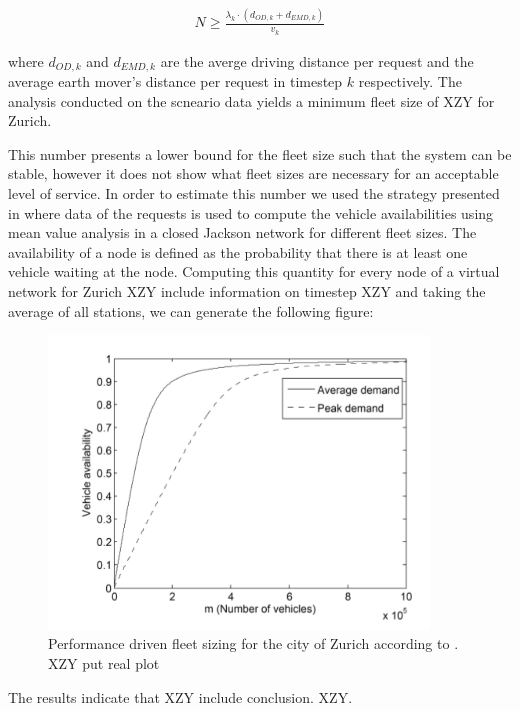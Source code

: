 \begin{align}
N \geq \frac{\lambda_k \cdot (d_{OD,k} + d_{EMD,k} )}{v_k}
\end{align}

where $d_{OD,k}$ and $d_{EMD,k}$ are the averge driving distance per request and the average earth mover's distance per request in timestep $k$ respectively. The analysis conducted on the scneario data yields a minimum fleet size of XZY for Zurich.

This number presents a lower bound for the fleet size such that the system can be stable, however it does not show what fleet sizes are necessary for an acceptable level of service. In order to estimate this number we used the strategy presented in \cite{spieser2014toward} where data of the requests is used to compute the vehicle availabilities using mean value analysis in a closed Jackson network for different fleet sizes. The availability of a node is defined as the probability that there is at least one vehicle waiting at the node. Computing this quantity for every node of a virtual network for Zurich  XZY include information on timestep XZY and taking the average of all stations, we can generate the following figure:




\begin{figure}[h]
\begin{center}\includegraphics[width=0.9\textwidth]{figures/performancePlot.png}\end{center}
\caption{Performance driven fleet sizing for the city of Zurich according to \cite{spieser2014toward}. XZY put real plot}
\label{fig:performanceFleetSize}
\end{figure}

The results indicate that XZY include conclusion. XZY. 
